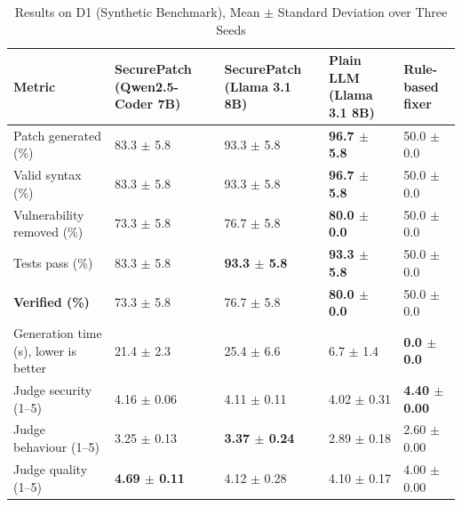 \documentclass[12pt,onecolumn,draftclsnofoot]{IEEEtran}
\begin{document}
\begin{table}[!tb]
\centering
\caption{Results on D1 (Synthetic Benchmark), Mean $\pm$ Standard Deviation over Three Seeds}
\label{tab:d1}
\small
\renewcommand{\arraystretch}{1.2}
\setlength{\tabcolsep}{4pt}
\begin{tabular}{L{4.3cm} C{2.45cm} C{2.45cm} C{2.45cm} C{2.45cm}}
\toprule
\textbf{Metric} & \textbf{SecurePatch (Qwen2.5-Coder 7B)} & \textbf{SecurePatch (Llama 3.1 8B)} & \textbf{Plain LLM (Llama 3.1 8B)} & \textbf{Rule-based fixer} \\
\midrule
Patch generated (\%) & 83.3 $\pm$ 5.8 & 93.3 $\pm$ 5.8 & \textbf{96.7 $\pm$ 5.8} & 50.0 $\pm$ 0.0 \\
Valid syntax (\%) & 83.3 $\pm$ 5.8 & 93.3 $\pm$ 5.8 & \textbf{96.7 $\pm$ 5.8} & 50.0 $\pm$ 0.0 \\
Vulnerability removed (\%) & 73.3 $\pm$ 5.8 & 76.7 $\pm$ 5.8 & \textbf{80.0 $\pm$ 0.0} & 50.0 $\pm$ 0.0 \\
Tests pass (\%) & 83.3 $\pm$ 5.8 & \textbf{93.3 $\pm$ 5.8} & \textbf{93.3 $\pm$ 5.8} & 50.0 $\pm$ 0.0 \\
\textbf{Verified (\%)} & 73.3 $\pm$ 5.8 & 76.7 $\pm$ 5.8 & \textbf{80.0 $\pm$ 0.0} & 50.0 $\pm$ 0.0 \\
Generation time (s), lower is better & 21.4 $\pm$ 2.3 & 25.4 $\pm$ 6.6 & 6.7 $\pm$ 1.4 & \textbf{0.0 $\pm$ 0.0} \\
Judge security (1--5) & 4.16 $\pm$ 0.06 & 4.11 $\pm$ 0.11 & 4.02 $\pm$ 0.31 & \textbf{4.40 $\pm$ 0.00} \\
Judge behaviour (1--5) & 3.25 $\pm$ 0.13 & \textbf{3.37 $\pm$ 0.24} & 2.89 $\pm$ 0.18 & 2.60 $\pm$ 0.00 \\
Judge quality (1--5) & \textbf{4.69 $\pm$ 0.11} & 4.12 $\pm$ 0.28 & 4.10 $\pm$ 0.17 & 4.00 $\pm$ 0.00 \\
\bottomrule
\end{tabular}
\end{table}
\end{document}
